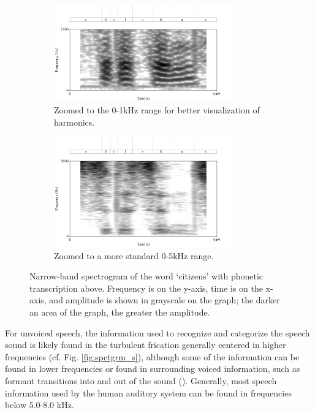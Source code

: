 \begin{figure}[H]
\begin{subfigure}{\textwidth}
  \centering
  \includegraphics[width=0.85\textwidth]{figure/spctgrm1k.png}
  \caption{Zoomed to the 0-1kHz range for better visualization of harmonics.}
  \label{fig:spctgrm_citizen_1k}
\end{subfigure}%
\hfill
\begin{subfigure}{0.95\textwidth}
  \centering
  \includegraphics[width=0.85\textwidth]{figure/spctgrm5k.png}
  \caption{Zoomed to a more standard 0-5kHz range.}
  \label{fig:spctgrm_citizen_5k}
\end{subfigure}
\caption{Narrow-band spectrogram of the word `citizens' with phonetic transcription above.  Frequency is on the y-axis, time is on the x-axis, and amplitude is shown in grayscale on the graph; the darker an area of the graph, the greater the amplitude.}
\label{fig:spctgrm_citizen}
\end{figure}

For unvoiced speech, the information used to recognize and categorize the speech sound is likely found in the turbulent frication generally centered in higher frequencies (cf. Fig. \ref{fig:spctgrm_s}), although some of the information can be found in lower frequencies or found in surrounding voiced information, such as formant transitions into and out of the sound (\cite{halle:57,lindblom:63,stevens:78,willi:17}).  Generally, most speech information used by the human auditory system can be found in frequencies below 5.0-8.0 kHz.

